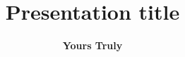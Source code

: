 \documentclass[xcolor=dvipsnames, compress, aspectratio=169]{beamer}
\title{Presentation title}
\author{\textbf{Yours Truly}}
\begin{document}

\begin{frame}
  \maketitle
\end{frame}
\end{document}
